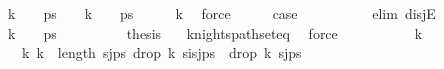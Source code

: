 \begin{isabellebody}
\ {\isachardoublequoteopen}{\isacharparenleft}{\kern0pt}k\ {\isacharequal}{\kern0pt}\ {}\ {\isasymand}\ ps\ {\isacharequal}{\kern0pt}\ {\isacharbrackleft}{\kern0pt}{\isacharbrackright}{\kern0pt}{\isacharparenright}{\kern0pt}\ {\isasymor}\ {\isacharparenleft}{\kern0pt}k\ {\isacharequal}{\kern0pt}\ {}\ {\isasymand}\ ps\ {\isasymnoteq}\ {\isacharbrackleft}{\kern0pt}{\isacharbrackright}{\kern0pt}{\isacharparenright}{\kern0pt}\ {\isasymor}\ {}\ {\isacharless}{\kern0pt}\ k{\isachardoublequoteclose}\ \isamarkupfalse%
\ force\isanewline
\ \ \isamarkupfalse%
\ \isamarkupfalse%
\ {\isacharquery}{\kern0pt}case\isanewline
\ \ \ \ \isamarkupfalse%
\ {}\isanewline
\ \ \isamarkupfalse%
\ {\isacharparenleft}{\kern0pt}elim\ disjE{\isacharparenright}{\kern0pt}\isanewline
\ \ \ \ \isamarkupfalse%
\ {\isachardoublequoteopen}k\ {\isacharequal}{\kern0pt}\ {}\ {\isasymand}\ ps\ {\isasymnoteq}\ {\isacharbrackleft}{\kern0pt}{\isacharbrackright}{\kern0pt}{\isachardoublequoteclose}\isanewline
\ \ \ \ \isamarkupfalse%
\ \isamarkupfalse%
\ {\isacharquery}{\kern0pt}thesis\ \isamarkupfalse%
\ {}\ knights{\isacharunderscore}{\kern0pt}path{\isacharunderscore}{\kern0pt}set{\isacharunderscore}{\kern0pt}eq\ \isamarkupfalse%
\ force\isanewline
\ \ \isamarkupfalse%
\isanewline
\ \ \ \ \isamarkupfalse%
\ {\isachardoublequoteopen}{}\ {\isacharless}{\kern0pt}\ k{\isachardoublequoteclose}\isanewline
\ \ \ \ \isamarkupfalse%
\ \isamarkupfalse%
\ {\isachardoublequoteopen}{}\ {\isacharless}{\kern0pt}\ k{\isacharminus}{\kern0pt}{}{\isachardoublequoteclose}\ {\isachardoublequoteopen}k{\isacharminus}{\kern0pt}{}\ {\isacharless}{\kern0pt}\ length\ {\isacharparenleft}{\kern0pt}s\isactrlsub j{\isacharhash}{\kern0pt}ps{\isacharparenright}{\kern0pt}{\isachardoublequoteclose}\ {\isachardoublequoteopen}drop\ k\ {\isacharparenleft}{\kern0pt}s\isactrlsub i{\isacharhash}{\kern0pt}s\isactrlsub j{\isacharhash}{\kern0pt}ps{\isacharparenright}{\kern0pt}\ {\isacharequal}{\kern0pt}\ drop\ {\isacharparenleft}{\kern0pt}k{\isacharminus}{\kern0pt}{}{\isacharparenright}{\kern0pt}\ {\isacharparenleft}{\kern0pt}s\isactrlsub j{\isacharhash}{\kern0pt}ps{\isacharparenright}{\kern0pt}{\isachardoublequoteclose}\ \isanewline
\ \ \ \ \ \ \isamarkupfalse%

\end{isabellebody}
